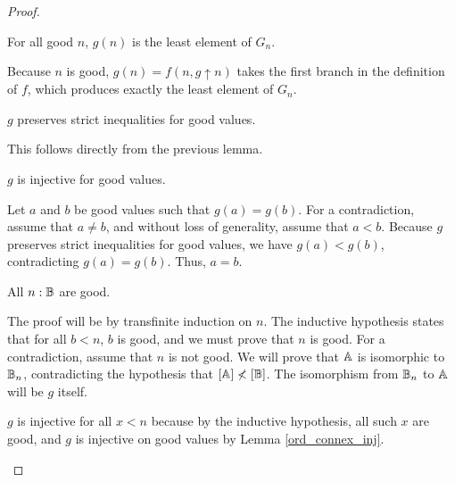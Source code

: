 \documentclass[../../math.tex]{subfiles}
\begin{document}
\begin{proof}
    \begin{lemma} \label{ord_connex_least}
        For all good $n$, $g(n)$ is the least element of $G_n$.
    \end{lemma}
    \begin{subproof}
        Because $n$ is good, $g(n) = f(n, g \uparrow n)$ takes the first branch
        in the definition of $f$, which produces exactly the least element of
        $G_n$.
    \end{subproof}

    \begin{lemma} \label{ord_connex_preserve}
        $g$ preserves strict inequalities for good values.
    \end{lemma}
    \begin{subproof}
        This follows directly from the previous lemma.
    \end{subproof}

    \begin{lemma} \label{ord_connex_inj}
        $g$ is injective for good values.
    \end{lemma}
    \begin{subproof}
        Let $a$ and $b$ be good values such that $g(a) = g(b)$.  For a
        contradiction, assume that $a \neq b$, and without loss of generality,
        assume that $a < b$.  Because $g$ preserves strict inequalities for good
        values, we have $g(a) < g(b)$, contradicting $g(a) = g(b)$.  Thus, $a =
        b$.
    \end{subproof}

    \begin{lemma} \label{ord_connex_all_good}
        All $n : \mathbb{B}$ are good.
    \end{lemma}
    \begin{subproof}
        The proof will be by transfinite induction on $n$.  The inductive
        hypothesis states that for all $b < n$, $b$ is good, and we must prove
        that $n$ is good.  For a contradiction, assume that $n$ is not good.  We
        will prove that $\mathbb{A}$ is isomorphic to $\mathbb{B}_n$, contradicting the
        hypothesis that $[\mathbb{A}] \nless [\mathbb{B}]$.  The isomorphism from $\mathbb{B}_n$ to $\mathbb{A}$
        will be $g$ itself.

        $g$ is injective for all $x < n$ because by the inductive hypothesis,
        all such $x$ are good, and $g$ is injective on good values by Lemma
        \ref{ord_connex_inj}.


\end{subproof}
\end{proof}
\end{document}

